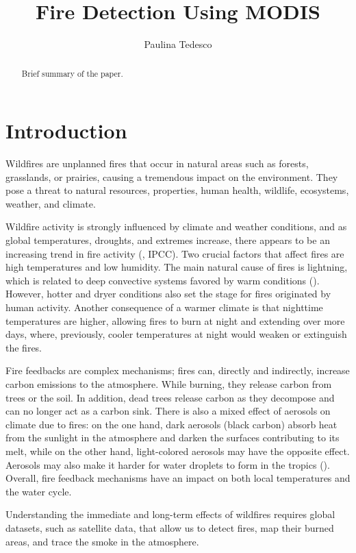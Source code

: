 \documentclass[a4paper, article, oneside, UKenglish]{memoir}
\title{Fire Detection Using MODIS}
\author{Paulina Tedesco}
\newcommand{\0}{\mathbf{0}}
\newcommand{\1}{\mathbf{1}}
\begin{document}
\projectfrontpage


\begin{abstract}
    \noindent
    Brief summary of the paper.
\end{abstract}

\chapter{Introduction}

Wildfires are unplanned fires that occur in natural areas such as forests, grasslands, or prairies, causing a tremendous impact on the environment. They pose a threat to natural resources, properties, human health, wildlife, ecosystems, weather, and climate. 

Wildfire activity is strongly influenced by climate and weather conditions, and as global temperatures, droughts, and extremes increase, there appears to be an increasing trend in fire activity (\cite{jolly_and_william_2015}, IPCC). Two crucial factors that affect fires are high temperatures and low humidity. The main natural cause of fires is lightning, which is related to deep convective systems favored by warm conditions (\cite{veraverbeke_et_al_2017}). However, hotter and dryer conditions also set the stage for fires originated by human activity. Another consequence of a warmer climate is that nighttime temperatures are higher, allowing fires to burn at night and extending over more days, where, previously, cooler temperatures at night would weaken or extinguish the fires.

Fire feedbacks are complex mechanisms; fires can, directly and indirectly, increase carbon emissions to the atmosphere. While burning, they release carbon from trees or the soil. In addition, dead trees release carbon as they decompose and can no longer act as a carbon sink. There is also a mixed effect of aerosols on climate due to fires: on the one hand, dark aerosols (black carbon) absorb heat from the sunlight in the atmosphere and darken the surfaces contributing to its melt, while on the other hand, light-colored aerosols may have the opposite effect. Aerosols may also make it harder for water droplets to form in the tropics (\cite{tosca_et_al_2012}). Overall, fire feedback mechanisms have an impact on both local temperatures and the water cycle.

Understanding the immediate and long-term effects of wildfires requires global datasets, such as satellite data, that allow us to detect fires, map their burned areas, and trace the smoke in the atmosphere.
\end{document}
